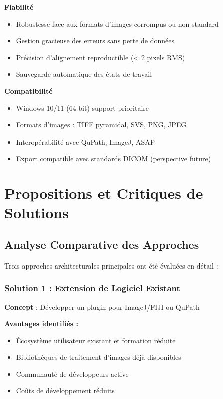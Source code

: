 \documentclass[12pt,a4paper]{report}
\begin{document}
\textbf{Fiabilité}
\begin{itemize}
\item Robustesse face aux formats d'images corrompus ou non-standard
\item Gestion gracieuse des erreurs sans perte de données
\item Précision d'alignement reproductible (< 2 pixels RMS)
\item Sauvegarde automatique des états de travail
\end{itemize}

\textbf{Compatibilité}
\begin{itemize}
\item Windows 10/11 (64-bit) support prioritaire
\item Formats d'images : TIFF pyramidal, SVS, PNG, JPEG
\item Interopérabilité avec QuPath, ImageJ, ASAP
\item Export compatible avec standards DICOM (perspective future)
\end{itemize}

\section{Propositions et Critiques de Solutions}

\subsection{Analyse Comparative des Approches}

Trois approches architecturales principales ont été évaluées en détail :

\subsubsection{Solution 1 : Extension de Logiciel Existant}

\textbf{Concept} : Développer un plugin pour ImageJ/FIJI ou QuPath

\textbf{Avantages identifiés :}
\begin{itemize}
\item Écosystème utilisateur existant et formation réduite
\item Bibliothèques de traitement d'images déjà disponibles
\item Communauté de développeurs active
\item Coûts de développement réduits
\end{itemize}
\end{document}
